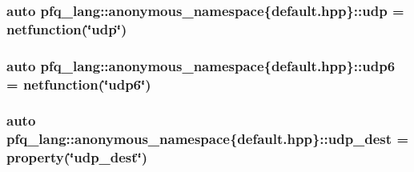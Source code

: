 \hypertarget{namespacepfq__lang_1_1anonymous__namespace_02default_8hpp_03_a1f18de2040dd9d74a07b1c535911abdf}{
\subsubsection[{udp}]{\setlength{\rightskip}{0pt plus 5cm}auto pfq\+\_\+lang\+::anonymous\+\_\+namespace\{default.\+hpp\}\+::udp = {\bf netfunction}(\char`\"{}udp\char`\"{})}}\label{namespacepfq__lang_1_1anonymous__namespace_02default_8hpp_03_a1f18de2040dd9d74a07b1c535911abdf}
\hypertarget{namespacepfq__lang_1_1anonymous__namespace_02default_8hpp_03_a84b7a888d00d5dfea606f7df96ba0ad3}{
\subsubsection[{udp6}]{\setlength{\rightskip}{0pt plus 5cm}auto pfq\+\_\+lang\+::anonymous\+\_\+namespace\{default.\+hpp\}\+::udp6 = {\bf netfunction}(\char`\"{}udp6\char`\"{})}}\label{namespacepfq__lang_1_1anonymous__namespace_02default_8hpp_03_a84b7a888d00d5dfea606f7df96ba0ad3}
\hypertarget{namespacepfq__lang_1_1anonymous__namespace_02default_8hpp_03_a4f869214bea58f5ed42b3faded5ab088}{
\subsubsection[{udp\+\_\+dest}]{\setlength{\rightskip}{0pt plus 5cm}auto pfq\+\_\+lang\+::anonymous\+\_\+namespace\{default.\+hpp\}\+::udp\+\_\+dest = {\bf property}(\char`\"{}udp\+\_\+dest\char`\"{})}}\label{namespacepfq__lang_1_1anonymous__namespace_02default_8hpp_03_a4f869214bea58f5ed42b3faded5ab088}
